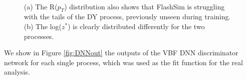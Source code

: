\begin{figure}
    \myfloatalign
    \\
    \caption[Angular distributions]{ (a) The R($p_T$) distribution also shows that FlashSim is struggling with the tails of the DY process, previously unseen during training. (b) The log($z^*$) is clearly distributed differently for the two processes.}\label{fig:angulardist}
    
\end{figure}

We show in Figure \ref{fig:DNNout} the outputs of the VBF DNN discriminator network for each single process, which was used as the fit function for the real analysis.

